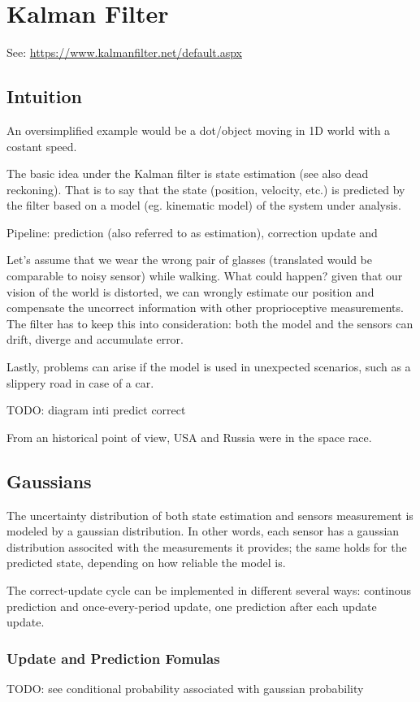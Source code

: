 \chapter{Kalman Filter}

See: \url{https://www.kalmanfilter.net/default.aspx}

\section{Intuition}
An oversimplified example would be a dot/object moving in 1D world with a costant speed.

The basic idea under the Kalman filter is state estimation (see also dead reckoning).
That is to say that the state (position, velocity, etc.) is predicted by the filter based on a model (eg. kinematic model) of the system under analysis.

Pipeline: prediction (also referred to as estimation), correction update and 

Let's assume that we wear the wrong pair of glasses (translated would be comparable to noisy sensor) while walking.
What could happen? given that our vision of the world is distorted, we can wrongly estimate our position and compensate the uncorrect information with other proprioceptive measurements.
The filter has to keep this into consideration: both the model and the sensors can drift, diverge and accumulate error.

Lastly, problems can arise if the model is used in unexpected scenarios, such as a slippery road in case of a car.

TODO: diagram inti predict correct

From an historical point of view, USA and Russia were in the space race.

\section{Gaussians}
The uncertainty distribution of both state estimation and sensors measurement is modeled by a gaussian distribution.
In other words, each sensor has a gaussian distribution associted with the measurements it provides; the same holds for the predicted state, depending on how reliable the model is.

The correct-update cycle can be implemented in different several ways: continous prediction and once-every-period update, one prediction after each update update.

\subsection{Update and Prediction Fomulas}
TODO: see conditional probability associated with gaussian probability

